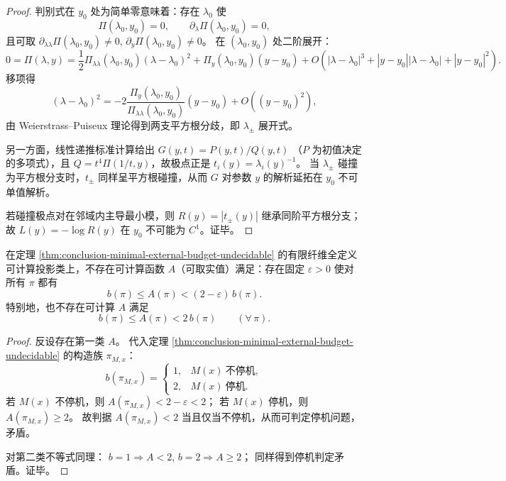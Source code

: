 \begin{proof}
判别式在 \(y_0\) 处为简单零意味着：存在 \(\lambda_0\) 使
\[
\Pi(\lambda_0,y_0)=0,\qquad
\partial_{\lambda}\Pi(\lambda_0,y_0)=0,
\]
且可取
\(
\partial_{\lambda\lambda}\Pi(\lambda_0,y_0)\neq 0
\),
\(
\partial_y\Pi(\lambda_0,y_0)\neq 0
\)。
在 \((\lambda_0,y_0)\) 处二阶展开：
\[
0=\Pi(\lambda,y)
=\frac12\Pi_{\lambda\lambda}(\lambda_0,y_0)(\lambda-\lambda_0)^2
+\Pi_y(\lambda_0,y_0)(y-y_0)
+O\!\left(|\lambda-\lambda_0|^3+|y-y_0||\lambda-\lambda_0|+|y-y_0|^2\right).
\]
移项得
\[
(\lambda-\lambda_0)^2
=-2\frac{\Pi_y(\lambda_0,y_0)}{\Pi_{\lambda\lambda}(\lambda_0,y_0)}(y-y_0)
+O\!\left((y-y_0)^2\right),
\]
由 Weierstrass--Puiseux 理论得到两支平方根分歧，即 \(\lambda_{\pm}\) 展开式。

另一方面，线性递推标准计算给出
\(
G(y,t)=P(y,t)/Q(y,t)
\)
（\(P\) 为初值决定的多项式），且 \(Q=t^4\Pi(1/t,y)\)，故极点正是 \(t_i(y)=\lambda_i(y)^{-1}\)。
当 \(\lambda_{\pm}\) 碰撞为平方根分支时，\(t_{\pm}\) 同样呈平方根碰撞，从而 \(G\) 对参数 \(y\) 的解析延拓在 \(y_0\) 不可单值解析。

若碰撞极点对在邻域内主导最小模，则
\(
R(y)=|t_{\pm}(y)|
\)
继承同阶平方根分支；
故 \(L(y)=-\log R(y)\) 在 \(y_0\) 不可能为 \(C^1\)。证毕。
\end{proof}

\begin{theorem}\label{thm:conclusion-budget-factor2-inapproximability}
在定理 \ref{thm:conclusion-minimal-external-budget-undecidable} 的有限纤维全定义可计算投影类上，不存在可计算函数 \(A\)（可取实值）满足：存在固定 \(\varepsilon>0\) 使对所有 \(\pi\) 都有
\[
b(\pi)\le A(\pi)<(2-\varepsilon)\,b(\pi).
\]
特别地，也不存在可计算 \(A\) 满足
\[
b(\pi)\le A(\pi)<2\,b(\pi)\qquad(\forall\,\pi).
\]
\end{theorem}

\begin{proof}
反设存在第一类 \(A\)。
代入定理 \ref{thm:conclusion-minimal-external-budget-undecidable} 的构造族 \(\pi_{M,x}\)：
\[
b(\pi_{M,x})=
\begin{cases}
1,& M(x)\ \text{不停机},\\
2,& M(x)\ \text{停机}.
\end{cases}
\]
若 \(M(x)\) 不停机，则 \(A(\pi_{M,x})<2-\varepsilon<2\)；
若 \(M(x)\) 停机，则 \(A(\pi_{M,x})\ge 2\)。
故判据
\(
A(\pi_{M,x})<2
\)
当且仅当不停机，从而可判定停机问题，矛盾。

对第二类不等式同理：
\(
b=1\Rightarrow A<2
\),
\(
b=2\Rightarrow A\ge 2
\)；
同样得到停机判定矛盾。证毕。
\end{proof}


